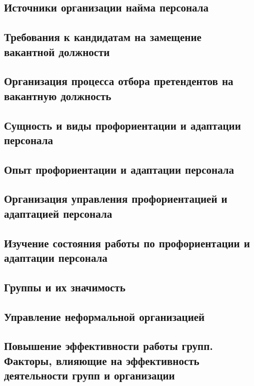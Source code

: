 \documentclass[a4paper,12pt,oneside,final]{extarticle}
\numberwithin{equation}{section}
\begin{document}
\subsection{Источники организации найма персонала}

\subsection{Требования к кандидатам на замещение вакантной должности}

\subsection{Организация процесса отбора претендентов на вакантную должность}

\subsection{Сущность и виды профориентации и адаптации персонала}

\subsection{Опыт профориентации и адаптации персонала}

\subsection{Организация управления профориентацией и адаптацией персонала}

\subsection{Изучение состояния работы по профориентации и адаптации персонала}

\subsection{Группы и их значимость}

\subsection{Управление неформальной организацией }

\subsection{Повышение эффективности работы групп. Факторы, влияющие на эффективность деятельности групп и организации}
\end{document}
